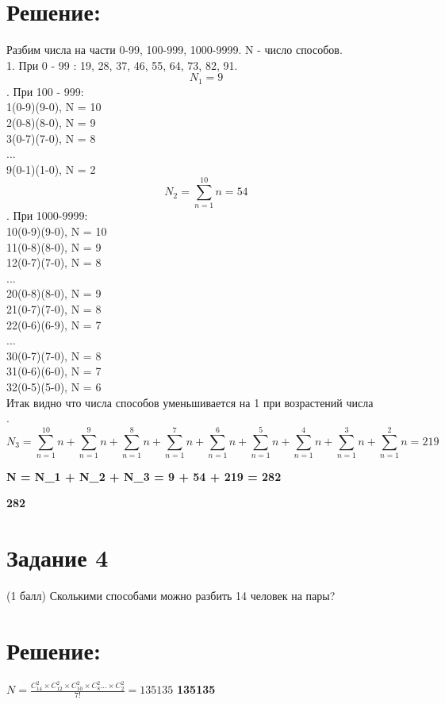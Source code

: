 \documentclass[a4paper,11pt]{article}
\theoremstyle{mytheor}
\begin{document}
\section*{Решение:}
Разбим числа на части 0-99, 100-999, 1000-9999. N - число способов.\\
1. При 0 - 99 : 19, 28, 37, 46, 55, 64, 73, 82, 91.\\
$$N_1 = 9$$
. При 100 - 999: \\
1(0-9)(9-0), N = 10 \\
2(0-8)(8-0), N = 9  \\
3(0-7)(7-0), N = 8  \\
... \\
9(0-1)(1-0),  N = 2  \\
$$N_2 = \sum_{n=1}^{10} n = 54$$ 
. При 1000-9999: \\
10(0-9)(9-0), N = 10  \\
11(0-8)(8-0), N = 9 \\
12(0-7)(7-0), N = 8  \\
... \\
20(0-8)(8-0), N = 9 \\ 
21(0-7)(7-0), N = 8 \\ 
22(0-6)(6-9), N = 7 \\ 
...\\
30(0-7)(7-0), N = 8  \\ 
31(0-6)(6-0), N =  7  \\ 
32(0-5)(5-0), N =  6  \\ 
Итак видно что числа способов уменьшивается на 1 при возрастений числа\\.  
$$N_3 = \sum_{n=1}^{10} n + \sum_{n=1}^{9} n + \sum_{n=1}^{8} n + \sum_{n=1}^{7} n + \sum_{n=1}^{6} n + \sum_{n=1}^{5} n + \sum_{n=1}^{4} n + \sum_{n=1}^{3} n + \sum_{n=1}^{2} n = 219$$	

\vspace{0.5 cm}

\textbf{N = N_1 + N_2 + N_3 = 9 + 54 + 219 = 282}\newline

\textbf{ 282}

\section*{Задание 4}
(1 балл) Сколькими способами можно разбить 14 человек на пары?
\newline
\section*{Решение:}
\large $N = \frac{C_{14}^{2} \times C_{12}^{2} \times C_{10}^{2} \times C_{8}^{2} ... \times C_{2}^{2}}{7!} = 135135$\newline
\textbf{ 135135}
\end{document}
